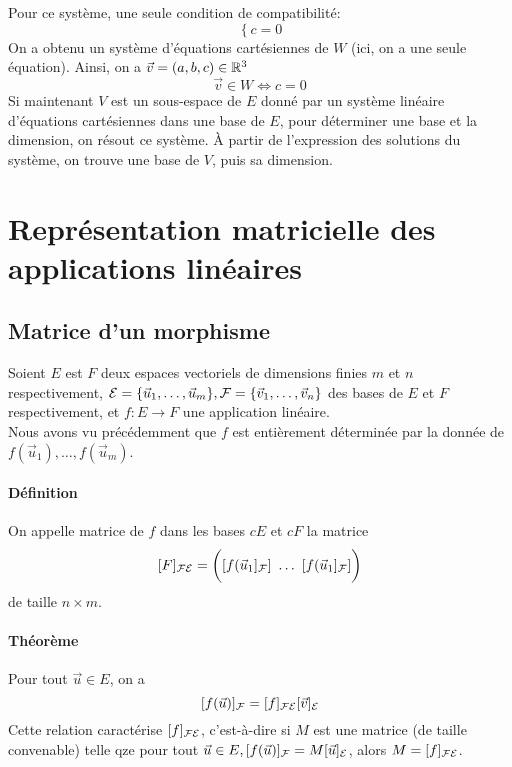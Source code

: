 Pour ce système, une seule condition de compatibilité:
$$\left\{ c = 0 \right.$$
On a obtenu un système d'équations cartésiennes de $W$ (ici, on a une seule équation). Ainsi, on a $\vec{v} = (a, b, c) \in \mathbb{R}^3$
$$\vec{v} \in W \Leftrightarrow c = 0$$
Si maintenant $V$ est un sous-espace de $E$ donné par un système linéaire d'équations cartésiennes dans une base de $E$, pour déterminer une base et la dimension, on résout ce système. À partir de l'expression des solutions du système, on trouve une base de $V$, puis sa dimension.

%
%
\section{Représentation matricielle des applications linéaires}
%
%

%
\subsection{Matrice d'un morphisme}
%
Soient $E$ est $F$ deux espaces vectoriels de dimensions finies $m$ et $n$ respectivement, $\mathcal{E} = \{ \vec{u}_1, \dots, \vec{u}_m\}, \mathcal{F} = \{\vec{v}_1, \ldots, \vec{v}_n\}$ des bases de $E$ et $F$ respectivement, et $f: E \rightarrow F$ une application linéaire. \\
Nous avons vu précédemment que $f$ est entièrement déterminée par la donnée de $f(\vec{u}_1), \ldots, f(\vec{u}_m)$.

\paragraph{Définition} On appelle matrice de $f$ dans les bases $cE$ et $cF$ la  matrice
$$[F]_{\mathcal{F} \mathcal{E}} = \bigg(
  [f(\vec{u}_1]_{\mathcal{F}}] ~ \ldots ~ [f(\vec{u}_1]_{\mathcal{F}}]
\bigg)$$
de taille $n \times m$.

\paragraph{Théorème} Pour tout $\vec{u} \in E$, on a 
$$[f(\vec{u})]_{\mathcal{F}} = [f]_{\mathcal{F} \mathcal{E}} [\vec{v}]_{\mathcal{E}}$$
Cette relation caractérise $[f]_{\mathcal{F} \mathcal{E}}$, c'est-à-dire si $M$ est une matrice (de taille convenable) telle qze pour tout $\vec{u} \in E, [f(\vec{u})]_{\mathcal{F}} = M [\vec{u}]_{\mathcal{E}}$, alors $M = [f]_{\mathcal{F} \mathcal{E}}$.

